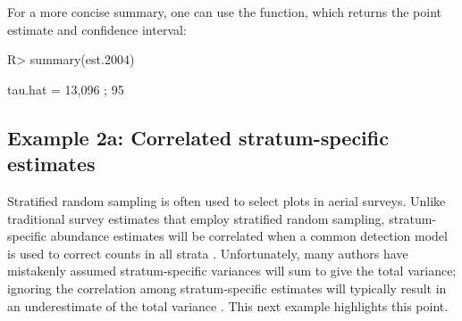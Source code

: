 \documentclass[nojss]{jss}
\begin{document}
For a more concise summary, one can use the  function,
which returns the point estimate and confidence interval:
\begin{Schunk}
\begin{Sinput}
R> summary(est.2004)
\end{Sinput}
\begin{Soutput}
[1] tau.hat =  13,096 ;   95 % CI = (  8,549 ,  21,430 )
\end{Soutput}
\end{Schunk}

\subsection{Example 2a:  Correlated stratum-specific estimates}
Stratified random sampling is often used to select plots in aerial
surveys. Unlike traditional survey estimates that employ stratified
random sampling, stratum-specific abundance estimates will be
correlated when a common detection model is used to correct counts
in all strata \citep{FiebGiud2008}. Unfortunately, many authors have
mistakenly assumed stratum-specific variances will sum to give the
total variance; ignoring the correlation among stratum-specific
estimates will typically result in an underestimate of the total
variance \citep{FiebGiud2008}.  This next example highlights this
point.
\end{document}
